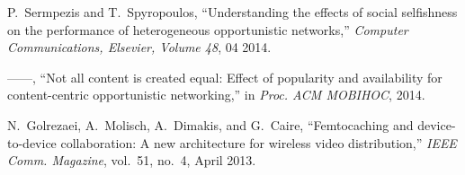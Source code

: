 \documentclass[10pt,conference,letterpaper]{IEEEtran}
\begin{document}
\begin{thebibliography}{10}
P.~Sermpezis and T.~Spyropoulos, ``{U}nderstanding the effects of social
  selfishness on the performance of heterogeneous opportunistic networks,''
  \emph{{C}omputer {C}ommunications, {E}lsevier, {V}olume 48}, 04 2014.

------, ``{N}ot all content is created equal: {E}ffect of popularity and
  availability for content-centric opportunistic networking,'' in \emph{Proc.
  ACM MOBIHOC}, 2014.

N.~Golrezaei, A.~Molisch, A.~Dimakis, and G.~Caire, ``Femtocaching and
  device-to-device collaboration: A new architecture for wireless video
  distribution,'' \emph{IEEE Comm. Magazine}, vol.~51, no.~4, April 2013.

\end{thebibliography}




\appendix
\end{document}
